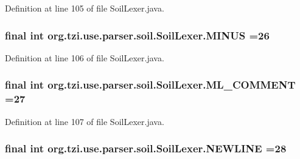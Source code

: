 Definition at line 105 of file Soil\-Lexer.\-java.

\hypertarget{classorg_1_1tzi_1_1use_1_1parser_1_1soil_1_1_soil_lexer_a69823e5392f36eb0458c90fa396323d3}{
\subsubsection[{M\-I\-N\-U\-S}]{\setlength{\rightskip}{0pt plus 5cm}final int org.\-tzi.\-use.\-parser.\-soil.\-Soil\-Lexer.\-M\-I\-N\-U\-S =26\hspace{0.3cm}{\ttfamily [static]}}}\label{classorg_1_1tzi_1_1use_1_1parser_1_1soil_1_1_soil_lexer_a69823e5392f36eb0458c90fa396323d3}


Definition at line 106 of file Soil\-Lexer.\-java.

\hypertarget{classorg_1_1tzi_1_1use_1_1parser_1_1soil_1_1_soil_lexer_a069d8cd12b84d63293a7549f16fc8d99}{
\subsubsection[{M\-L\-\_\-\-C\-O\-M\-M\-E\-N\-T}]{\setlength{\rightskip}{0pt plus 5cm}final int org.\-tzi.\-use.\-parser.\-soil.\-Soil\-Lexer.\-M\-L\-\_\-\-C\-O\-M\-M\-E\-N\-T =27\hspace{0.3cm}{\ttfamily [static]}}}\label{classorg_1_1tzi_1_1use_1_1parser_1_1soil_1_1_soil_lexer_a069d8cd12b84d63293a7549f16fc8d99}


Definition at line 107 of file Soil\-Lexer.\-java.

\hypertarget{classorg_1_1tzi_1_1use_1_1parser_1_1soil_1_1_soil_lexer_a0480c7ecf2c3e5656da5c1e97c942510}{
\subsubsection[{N\-E\-W\-L\-I\-N\-E}]{\setlength{\rightskip}{0pt plus 5cm}final int org.\-tzi.\-use.\-parser.\-soil.\-Soil\-Lexer.\-N\-E\-W\-L\-I\-N\-E =28\hspace{0.3cm}{\ttfamily [static]}}}\label{classorg_1_1tzi_1_1use_1_1parser_1_1soil_1_1_soil_lexer_a0480c7ecf2c3e5656da5c1e97c942510}


